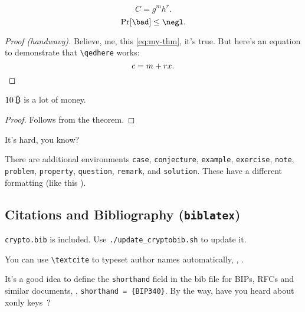 \begin{theorem}[My Theorem]\label{thm:my-thm}
  \begin{equation}\label{eq:my-thm}
    C = g^mh^r.
  \end{equation}
  \begin{equation}\label{eq:my-thm2}
    \Pr[\bad] \le \negl.
  \end{equation}
\end{theorem}
\begin{proof}[Proof (handwavy)]
  Believe, me, this \cref{eq:my-thm}, it's true.
  But here's an equation to demonstrate that \verb|\qedhere| works:
  \[ c = m+rx . \qedhere \]
\end{proof}

\begin{lemma}\label{thm:a-lemma}
  $10\,\btcsym$ is a lot of money.
\end{lemma}
\begin{proof}
  Follows from the theorem.
\end{proof}

\begin{assumption}\label{ass:very-hard}
  It's hard, you know?
\end{assumption}

\begin{remark}\label{rem:add-env}
  There are additional environments
  \texttt{case}, \texttt{conjecture}, \texttt{example}, \texttt{exercise}, \texttt{note}, \texttt{problem}, \texttt{property}, \texttt{question}, \texttt{remark}, and \texttt{solution}.
  These have a different formatting (like this ).
\end{remark}


\subsection{Citations and Bibliography (\texttt{biblatex})}
\texttt{crypto.bib} is included. Use \verb|./update_cryptobib.sh| to update it.

You can use \verb|\textcite| to typeset author names automatically, \eg, \textcite{CCS:BelNev06,EPRINT:NicRufSeu20}.

It's a good idea to define the \texttt{shorthand} field in the bib file for BIPs, RFCs and similar documents, \eg, \verb|shorthand = {BIP340}|. By the way, have you heard about xonly keys~\cite{add:bip-schnorr}?

